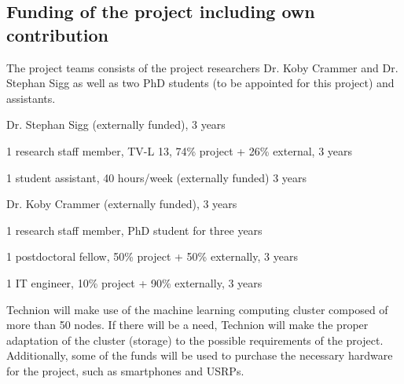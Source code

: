 \documentclass[12pt]{article}
\newcommand{\nolineskips}{
	\setlength{\parskip}{0pt}
	\setlength{\parsep}{0pt}
	\setlength{\topsep}{0pt}
	\setlength{\partopsep}{0pt}
	\setlength{\itemsep}{0pt}}
\begin{document}
\subsection*{Funding of the project including own contribution}
The project teams consists of the project researchers Dr. Koby Crammer and Dr. Stephan Sigg as well as two PhD students (to be appointed for this project) and assistants.
\begin{description}
	\nolineskips
	\item[UGOE] Dr. Stephan Sigg (externally funded), 3 years
	\item[UGOE] 1 research staff member, TV-L 13, 74\% project + 26\% external, 3 years
	\item[UGOE] 1 student assistant, 40 hours/week (externally funded) 3 years
	\item[Technion] Dr. Koby Crammer (externally funded), 3 years 
	\item[Technion] 1 research staff member, PhD student for three years
	\item[Technion] 1 postdoctoral fellow, 50\% project + 50\% externally, 3 years
	\item[Technion] 1 IT engineer, 10\% project + 90\% externally, 3 years
\end{description}
Technion will make use of the machine learning computing cluster composed of more than 50 nodes. If there will be a need, Technion will make the proper adaptation of the cluster (storage) to the possible requirements of the project. Additionally, some of the funds will be used to purchase the necessary hardware for the project, such as smartphones and USRPs.


\pagebreak
\end{document}
